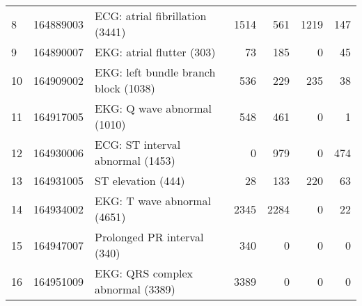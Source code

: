 \begin{tabular}{lllrrrr}
8 & 164889003 & ECG: atrial fibrillation (3441) & {\cellcolor[HTML]{2E8B57}} \color[HTML]{F1F1F1} 1514 & {\cellcolor[HTML]{B2D3C0}} \color[HTML]{000000} 561 & {\cellcolor[HTML]{57A177}} \color[HTML]{F1F1F1} 1219 & {\cellcolor[HTML]{EBF3ED}} \color[HTML]{000000} 147 \\
9 & 164890007 & EKG: atrial flutter (303) & {\cellcolor[HTML]{A0CAB2}} \color[HTML]{000000} 73 & {\cellcolor[HTML]{2E8B57}} \color[HTML]{F1F1F1} 185 & {\cellcolor[HTML]{EBF3ED}} \color[HTML]{000000} 0 & {\cellcolor[HTML]{BDD9C9}} \color[HTML]{000000} 45 \\
10 & 164909002 & EKG: left bundle branch block (1038) & {\cellcolor[HTML]{2E8B57}} \color[HTML]{F1F1F1} 536 & {\cellcolor[HTML]{A2CBB3}} \color[HTML]{000000} 229 & {\cellcolor[HTML]{A0CAB2}} \color[HTML]{000000} 235 & {\cellcolor[HTML]{EBF3ED}} \color[HTML]{000000} 38 \\
11 & 164917005 & EKG: Q wave abnormal (1010) & {\cellcolor[HTML]{2E8B57}} \color[HTML]{F1F1F1} 548 & {\cellcolor[HTML]{4C9B6F}} \color[HTML]{F1F1F1} 461 & {\cellcolor[HTML]{EBF3ED}} \color[HTML]{000000} 0 & {\cellcolor[HTML]{EBF3ED}} \color[HTML]{000000} 1 \\
12 & 164930006 & ECG: ST interval abnormal (1453) & {\cellcolor[HTML]{EBF3ED}} \color[HTML]{000000} 0 & {\cellcolor[HTML]{2E8B57}} \color[HTML]{F1F1F1} 979 & {\cellcolor[HTML]{EBF3ED}} \color[HTML]{000000} 0 & {\cellcolor[HTML]{90C1A5}} \color[HTML]{000000} 474 \\
13 & 164931005 & ST elevation (444) & {\cellcolor[HTML]{EBF3ED}} \color[HTML]{000000} 28 & {\cellcolor[HTML]{83BA9B}} \color[HTML]{000000} 133 & {\cellcolor[HTML]{2E8B57}} \color[HTML]{F1F1F1} 220 & {\cellcolor[HTML]{C9E0D2}} \color[HTML]{000000} 63 \\
14 & 164934002 & EKG: T wave abnormal (4651) & {\cellcolor[HTML]{2E8B57}} \color[HTML]{F1F1F1} 2345 & {\cellcolor[HTML]{328D5B}} \color[HTML]{F1F1F1} 2284 & {\cellcolor[HTML]{EBF3ED}} \color[HTML]{000000} 0 & {\cellcolor[HTML]{E9F2EC}} \color[HTML]{000000} 22 \\
15 & 164947007 & Prolonged PR interval (340) & {\cellcolor[HTML]{2E8B57}} \color[HTML]{F1F1F1} 340 & {\cellcolor[HTML]{EBF3ED}} \color[HTML]{000000} 0 & {\cellcolor[HTML]{EBF3ED}} \color[HTML]{000000} 0 & {\cellcolor[HTML]{EBF3ED}} \color[HTML]{000000} 0 \\
16 & 164951009 & EKG: QRS complex abnormal (3389) & {\cellcolor[HTML]{2E8B57}} \color[HTML]{F1F1F1} 3389 & {\cellcolor[HTML]{EBF3ED}} \color[HTML]{000000} 0 & {\cellcolor[HTML]{EBF3ED}} \color[HTML]{000000} 0 & {\cellcolor[HTML]{EBF3ED}} \color[HTML]{000000} 0 \\

\end{tabular}
